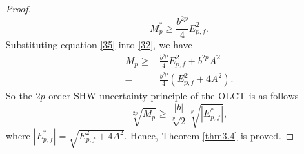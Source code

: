 \documentclass[10pt,a4paper]{amsart}
\begin{document}
\begin{proof}
\begin{equation}
	\label{35}
	M_p^* \ge \frac{b^{2p}}{4} E_{p,f}^2.
	\end{equation}
	Substituting equation \eqref{35} into \eqref{32}, we have
	\begin{align}
	\label{36}
	M_p \ge& \frac{b^{2p}}{4} E_{p,f}^2+b^{2p} A^2 \nonumber\\
	=&\frac{b^{2p}}{4} \left( E_{p,f}^2+4A^2 \right).
	\end{align}
	So the $2p$ order SHW uncertainty principle of the OLCT is as follows
	\begin{equation*}
	\sqrt[2p]{M_p} \ge \frac{|b|}{\sqrt[p]{2}} \sqrt[p]{\left| E_{p,f}^{*} \right|},
	\end{equation*}
	where $\left| E_{p,f}^{*} \right| = \sqrt{E_{p,f}^2+4A^2}$.
	Hence, Theorem \ref{thm3.4} is proved.
\end{proof}
\end{document}

